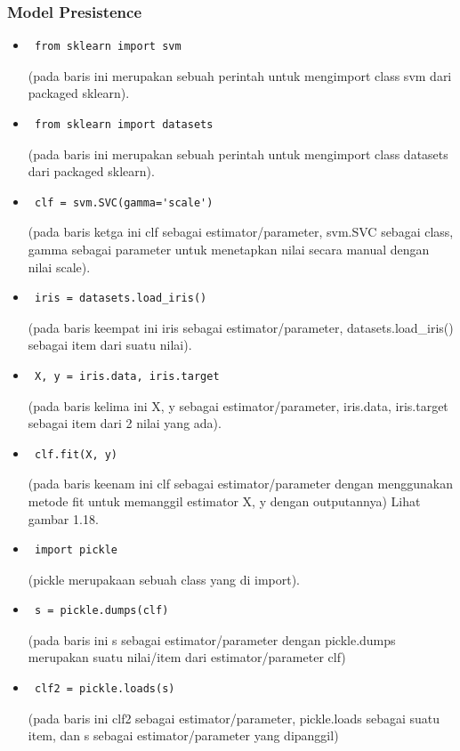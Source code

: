 \subsubsection{Model Presistence}
\begin{itemize}
\item\begin{verbatim} from sklearn import svm\end{verbatim}(pada baris ini merupakan sebuah perintah untuk mengimport class svm dari packaged sklearn).
\item\begin{verbatim} from sklearn import datasets\end{verbatim}(pada baris ini merupakan sebuah perintah untuk mengimport class datasets dari packaged sklearn).
\item\begin{verbatim} clf = svm.SVC(gamma='scale')\end{verbatim}(pada baris ketga ini clf sebagai estimator/parameter, svm.SVC sebagai class, gamma sebagai parameter untuk menetapkan nilai secara manual dengan nilai scale).
\item\begin{verbatim} iris = datasets.load_iris()\end{verbatim}(pada baris keempat ini iris sebagai estimator/parameter, datasets.load\_iris() sebagai item dari suatu nilai).
\item\begin{verbatim} X, y = iris.data, iris.target\end{verbatim}(pada baris kelima ini X, y sebagai estimator/parameter, iris.data, iris.target sebagai item dari 2 nilai yang ada).
\item\begin{verbatim} clf.fit(X, y)\end{verbatim}(pada baris keenam ini clf sebagai estimator/parameter dengan menggunakan metode fit untuk memanggil estimator X, y dengan outputannya) Lihat gambar 1.18.
\item\begin{verbatim} import pickle\end{verbatim}(pickle merupakaan sebuah class yang di import).
\item\begin{verbatim} s = pickle.dumps(clf)\end{verbatim}(pada baris ini s sebagai estimator/parameter dengan pickle.dumps merupakan suatu nilai/item dari estimator/parameter clf)
\item\begin{verbatim} clf2 = pickle.loads(s)\end{verbatim}(pada baris ini clf2 sebagai estimator/parameter, pickle.loads sebagai suatu item, dan s sebagai estimator/parameter yang dipanggil) 

\end{itemize}
